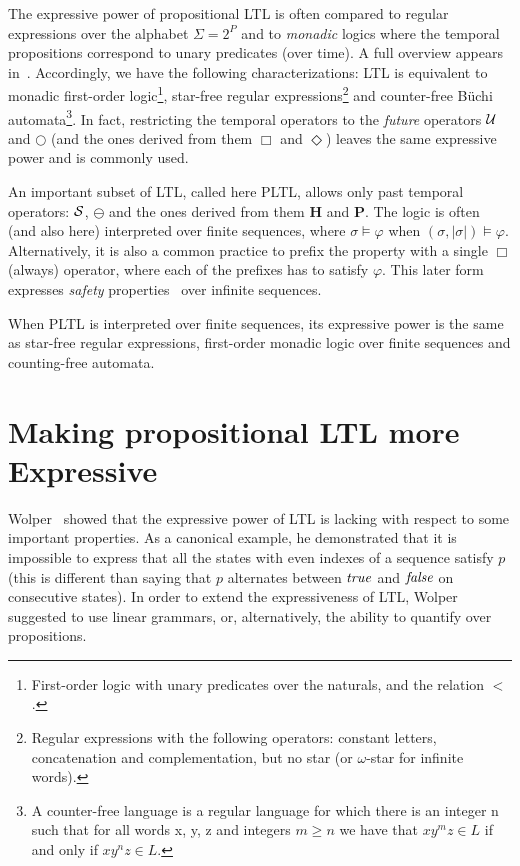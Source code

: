 The expressive power of propositional LTL is often compared to regular expressions
over the alphabet $\Sigma = 2^P$ and to  {\em monadic} logics where the temporal propositions
correspond to unary predicates (over time). A full overview appears in~\cite{Thomas}. Accordingly, we have the following characterizations:
LTL is equivalent to monadic first-order logic\footnote{First-order logic with unary predicates over the naturals, and the relation $<$.},  star-free regular expressions\footnote{Regular expressions with the following operators: constant letters, concatenation and complementation, but no star (or $\omega$-star for infinite words).} and counter-free B\"{u}chi automata\footnote{A counter-free language is a regular language for which there is an integer n such that for all words x, y, z and integers $m \geq n$ we have that $xy^m z \in L$ if and only if $xy^n z \in L$.}. In fact, restricting the temporal operators to the {\em future}  operators $\mathbin{\mathcal{U}}$ and $\bigcirc$
(and the ones derived from them $\Box$ and $\Diamond$)
leaves the same expressive power and is commonly used. 


An important subset of LTL, called here PLTL, allows only past temporal
operators: ${\cal S}$, $\ominus$ and the ones derived
from them $\mathbf{H}$ and $\mathbf{P}$. The logic is often
(and also here) interpreted over finite sequences, 
where $\sigma \models \varphi$ when $( \sigma , | \sigma | ) \models \varphi$.
Alternatively,
it is also a common practice to prefix the property with a single $\Box$ (always) operator, where each of the prefixes has to satisfy $\varphi$. This later
form expresses {\em safety} properties~\cite{AS} over infinite sequences. 



When PLTL is interpreted over finite sequences, its
expressive power is the same as star-free regular expressions, first-order monadic logic over finite sequences and counting-free automata.


\section{Making propositional LTL more Expressive}

Wolper~\cite{Wolper} showed that the expressive power of LTL is lacking with respect
to some important properties. As a canonical example, he demonstrated that it is impossible to
express that all the states with even indexes of a sequence
satisfy $p$ (this is
different than saying that $p$ alternates between $\mathit{true}$ and $\mathit{false}$ on consecutive states). In order to extend the expressiveness of LTL, Wolper suggested to use linear grammars, or, alternatively, the ability to quantify over
propositions. 


